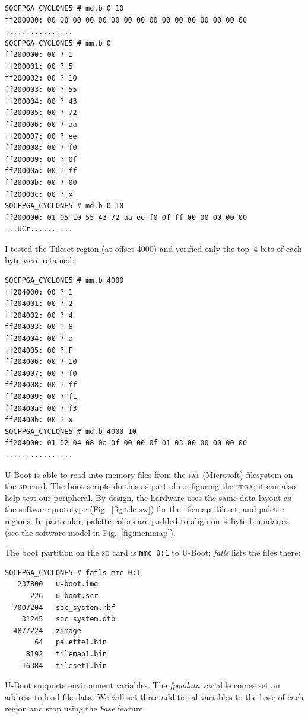 \documentclass[11pt]{article}
\newcommand{\figref}[1]{Fig.~\ref{fig:#1}}
\begin{document}
{\footnotesize 
\begin{verbatim}
SOCFPGA_CYCLONE5 # md.b 0 10 
ff200000: 00 00 00 00 00 00 00 00 00 00 00 00 00 00 00 00    ................
SOCFPGA_CYCLONE5 # mm.b 0
ff200000: 00 ? 1
ff200001: 00 ? 5
ff200002: 00 ? 10
ff200003: 00 ? 55
ff200004: 00 ? 43
ff200005: 00 ? 72
ff200006: 00 ? aa
ff200007: 00 ? ee
ff200008: 00 ? f0
ff200009: 00 ? 0f
ff20000a: 00 ? ff
ff20000b: 00 ? 00
ff20000c: 00 ? x
SOCFPGA_CYCLONE5 # md.b 0 10
ff200000: 01 05 10 55 43 72 aa ee f0 0f ff 00 00 00 00 00    ...UCr..........
\end{verbatim}
}

I tested the Tileset region (at offset 4000) and verified only the
top~4 bits of each byte were retained:

{\footnotesize 
\begin{verbatim}
SOCFPGA_CYCLONE5 # mm.b 4000 
ff204000: 00 ? 1
ff204001: 00 ? 2
ff204002: 00 ? 4
ff204003: 00 ? 8 
ff204004: 00 ? a
ff204005: 00 ? F
ff204006: 00 ? 10
ff204007: 00 ? f0
ff204008: 00 ? ff
ff204009: 00 ? f1
ff20400a: 00 ? f3
ff20400b: 00 ? x
SOCFPGA_CYCLONE5 # md.b 4000 10
ff204000: 01 02 04 08 0a 0f 00 00 0f 01 03 00 00 00 00 00    ................
\end{verbatim}
}

\clearpage

U-Boot is able to read into memory files from the \textsc{fat}
(Microsoft) filesystem on the \textsc{sd} card.  The boot scripts do
this as part of configuring the \textsc{fpga}; it can also help test
our peripheral.  By design, the hardware uses the same data layout as
the software prototype (\figref{tile-sw}) for the tilemap, tileset,
and palette regions.  In particular, palette colors are padded to
align on~4-byte boundaries (see the software model in \figref{memmap}).

The boot partition on the \textsc{sd} card is \texttt{mmc 0:1} to
U-Boot; \emph{fatls} lists the files there:

{\footnotesize
\begin{verbatim}
SOCFPGA_CYCLONE5 # fatls mmc 0:1 
   237800   u-boot.img 
      226   u-boot.scr 
  7007204   soc_system.rbf 
    31245   soc_system.dtb 
  4877224   zimage 
       64   palette1.bin 
     8192   tilemap1.bin 
    16384   tileset1.bin
\end{verbatim}
}

U-Boot supports environment variables.  The \emph{fpgadata} variable
comes set an address to load file data.  We will set three additional
variables to the base of each region and stop using the \emph{base}
feature.
\end{document}
